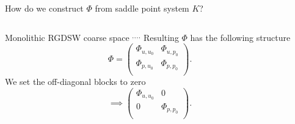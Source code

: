\begin{frame}{How do we construct $\varPhi$ from saddle point system $K$?}
	\begin{columns}
		\begin{column}{0.52\textwidth}
			\vspace{-10mm}
			\begin{block}{\normalsize Monolithic RGDSW coarse space \footnotemark[1]$^,$\footnotemark[2]$^,$\footnotemark[3]$^,$\footnotemark[4]$^,$\footnotemark[5]}
                \vspace{2mm}
				Resulting $\varPhi$ has the following structure
				\begin{equation*}
					\varPhi = \begin{pmatrix}
						\varPhi_{u,u_0} & \varPhi_{u,p_0} \\
						\varPhi_{p,u_0} & \varPhi_{p,p_0} \\
					\end{pmatrix}.
				\end{equation*}
                \vspace{2mm}
				We set the off-diagonal blocks to zero
				\begin{equation*}
					\implies\begin{pmatrix}
						\varPhi_{u,u_0} & 0               \\
						0               & \varPhi_{p,p_0} \\
					\end{pmatrix}.
				\end{equation*}
                \vspace{9mm}
			\end{block}
		\end{column}
		\begin{column}{0.52\textwidth}
			\vspace{-10mm}
\end{column}
\end{columns}
\end{frame}
